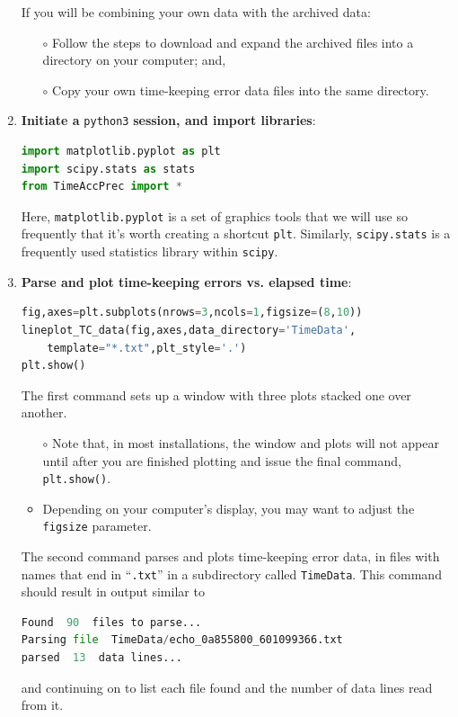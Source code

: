 \begin{enumerate}
	\smallskip
	If you will be combining your own data with the archived data:
	\begin{itemize}
		\item[$\circ$] Follow the steps to download and expand the archived files into a directory on your computer; and,
		\item[$\circ$] Copy your own time-keeping error data files into the same directory. 
	\end{itemize}
	
	\item \textbf{Initiate a } \lstinline{python3} \textbf{session, and import libraries}:
\begin{lstlisting}[language=Python]
import matplotlib.pyplot as plt
import scipy.stats as stats
from TimeAccPrec import * 
\end{lstlisting}
	Here, \lstinline{matplotlib.pyplot} is a set of graphics tools that we will use so frequently that it's worth creating a shortcut \lstinline{plt}.
	Similarly, \lstinline{scipy.stats} is a frequently used statistics library within \lstinline{scipy}.

	\item \textbf{Parse and plot time-keeping errors vs. elapsed time}:
\begin{lstlisting}[language=Python]
fig,axes=plt.subplots(nrows=3,ncols=1,figsize=(8,10))
lineplot_TC_data(fig,axes,data_directory='TimeData',
    template="*.txt",plt_style='.')
plt.show()
\end{lstlisting}
	The first command sets up a window with three plots stacked one over another.
	\begin{itemize}
		\item[$\circ$] Note that, in most \python installations, the window and plots will not appear until after you are finished plotting and issue the final command, \lstinline{plt.show()}.
		\item[$\circ$] Depending on your computer's display, you may want to adjust the \lstinline{figsize} parameter.
	\end{itemize}
	The second command parses and plots time-keeping error data, in files with names that end in ``\lstinline{.txt}'' in a subdirectory called \lstinline{TimeData}.
	This command should result in output similar to
\begin{lstlisting}[language=Python]
Found  90  files to parse...
Parsing file  TimeData/echo_0a855800_601099366.txt
parsed  13  data lines...
\end{lstlisting}
	and continuing on to list each file found and the number of data lines read from it.
	

\end{enumerate}
